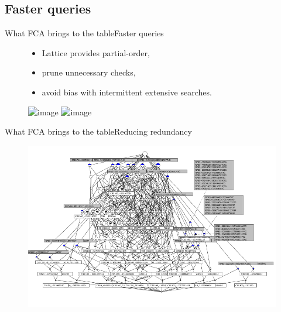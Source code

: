 \subsection{Faster queries}
\begin{frame}{What FCA brings to the table}{Faster queries}

\begin{figure}[ht]
  \begin{minipage}[t]{0.52\linewidth}
    \vspace{0pt}
      \begin{itemize}
      \item Lattice provides partial-order,
      \item prune unnecessary checks,
      \item<2> avoid bias with intermittent extensive searches.
      \end{itemize}
  \end{minipage}
  \hfill
  \begin{minipage}[t]{0.45\linewidth}
    \vspace{0pt}
    \centering
    \includegraphics<1-1>[width=\textwidth]{img/fca/hierarchy1}	
    \includegraphics<2-2>[width=\textwidth]{img/fca/hierarchy2}		
  \end{minipage}
\end{figure}

\end{frame}

\begin{frame}{What FCA brings to the table}{Reducing redundancy}


\begin{figure}[ht]
  \begin{minipage}[t]{0.8\linewidth}
    \vspace{0pt}
    \centering
    \includegraphics[width=\textwidth]{img/fca/lattice1}
  \end{minipage}
  \hfill
  \begin{minipage}[t]{0\linewidth}

  \end{minipage}
\end{figure}

\end{frame}


